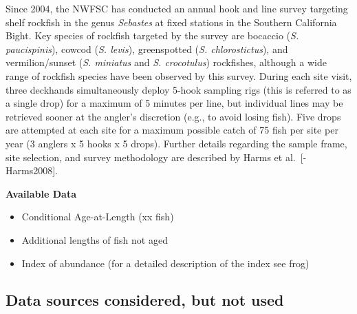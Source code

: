 \documentclass[11pt,
  english,
  a4paper,
]{article}
\begin{document}
Since 2004, the NWFSC has conducted an annual hook and line survey targeting shelf rockfish in the genus \emph{Sebastes} at fixed stations in the Southern California Bight. Key species of rockfish targeted by the survey are bocaccio (\emph{S. paucispinis}), cowcod (\emph{S. levis}), greenspotted (\emph{S. chlorostictus}), and vermilion/sunset (\emph{S. miniatus} and \emph{S. crocotulus}) rockfishes, although a wide range of rockfish species have been observed by this survey. During each site visit, three deckhands simultaneously deploy 5-hook sampling rigs (this is referred to as a single drop) for a maximum of 5 minutes per line, but individual lines may be retrieved sooner at the angler's discretion (e.g., to avoid losing fish). Five drops are attempted at each site for a maximum possible catch of 75 fish per site per year (3 anglers x 5 hooks x 5 drops). Further details regarding the sample frame, site selection, and survey methodology are described by Harms et al.~{[}-Harms2008{]}.

\textbf{Available Data}


\begin{itemize}
\item

  Conditional Age-at-Length (xx fish)

  \tagmcend\tagstructend\tagstructend
\item

  Additional lengths of fish not aged

  \tagmcend\tagstructend\tagstructend
\item

  Index of abundance (for a detailed description of the index see frog)

  \tagmcend\tagstructend\tagstructend
\end{itemize}

\tagstructend


\hypertarget{data-sources-considered-but-not-used}{%
\subsection{Data sources considered, but not used}\label{data-sources-considered-but-not-used}}
\end{document}
